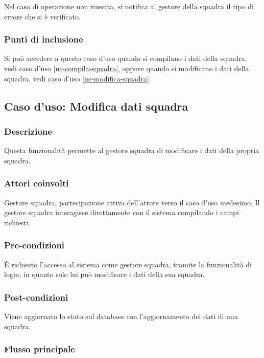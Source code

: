Nel caso di operazione non riuscita, si notifica al gestore della squadra il tipo di errore che si è verificato.

\subsubsection*{Punti di inclusione}
Si può accedere a questo caso d'uso quando si compilano i dati della squadra, vedi caso d'uso \vref{uc-compila-squadra}, oppure quando si modificano i dati della squadra, vedi caso d'uso \vref{uc-modifica-squadra}.


%
%
\subsection{Caso d'uso: Modifica dati squadra}
\label{uc-modifica-squadra}

\subsubsection*{Descrizione}
Questa funzionalità permette al gestore squadra di modificare i dati della propria squadra.

\subsubsection*{Attori coinvolti}
Gestore squadra, partecipazione attiva dell'attore verso il caso d'uso medesimo.
Il gestore squadra interagisce direttamente con il sistema compilando i campi richiesti.

\subsubsection*{Pre-condizioni}
È richiesto l'accesso al sistema come gestore squadra, tramite la funzionalità di login, in quanto solo lui può modificare i dati della sua squadra.

\subsubsection*{Post-condizioni}
Viene aggiornato lo stato sul database con l'aggiornamento dei dati di una squadra.

\subsubsection*{Flusso principale}

